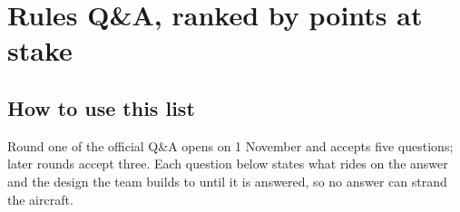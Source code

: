   {}

\section{Rules Q\&A, ranked by points at stake}\label{sec:qa}
\subsection{How to use this list}
Round one of the official Q\&A opens on 1 November and accepts five questions; later rounds accept three. Each question below states what rides on the answer and the design the team builds to until it is answered, so no answer can strand the aircraft.

